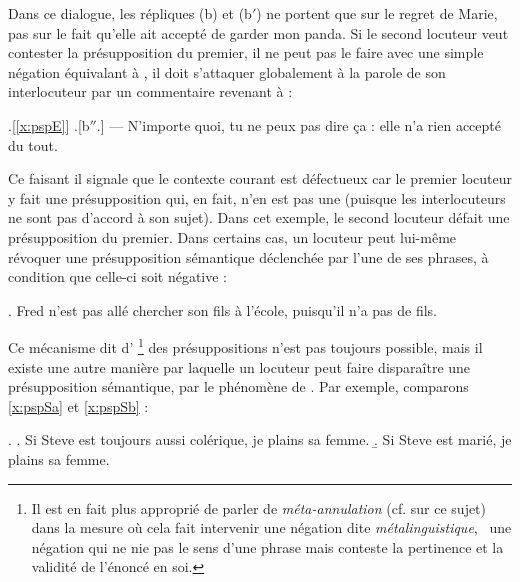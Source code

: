 \begin{refsegment}
Dans ce dialogue, les répliques (b) et (b$'$) ne portent que sur le regret de Marie, pas sur le fait qu'elle ait accepté de garder mon panda.
Si le second locuteur veut contester la présupposition du premier, il ne peut pas le faire avec une simple négation équivalant à , il doit s'attaquer globalement à la parole de son interlocuteur par un commentaire revenant à  : 

\ex.[\ref{x:pspE}] 
\a.[b$''$.] --- N'importe quoi, tu ne peux pas dire ça : elle n'a rien accepté du tout.

Ce faisant il signale que le contexte courant est défectueux car le premier locuteur y fait une présupposition qui, en fait, n'en est pas une (puisque les interlocuteurs ne sont pas d'accord à son sujet). 
Dans cet exemple, le second locuteur défait une présupposition du premier.  Dans certains cas, un locuteur peut lui-même révoquer une présupposition sémantique déclenchée par l'une de ses phrases, à condition que celle-ci soit négative :

\ex.
Fred n'est pas allé chercher son fils à l'école, puisqu'il n'a pas de fils.


Ce mécanisme dit d'%
\footnote{Il est en fait plus approprié de parler de \emph{méta-annulation} (cf. \citet{Amsili:07} sur ce sujet) dans la mesure où cela fait intervenir une négation dite \emph{métalinguistique},
\ie\ une négation qui ne nie pas le sens d'une phrase mais conteste la pertinence et la validité de l'énoncé en soi. }%
 des présuppositions n'est pas toujours possible, mais il existe une autre manière par laquelle un locuteur peut faire disparaître une présupposition sémantique, par le phénomène de .\label{p.suspen}  
Par exemple, comparons \ref{x:pspSa} et \ref{x:pspSb} :

\ex.
\a. Si Steve est toujours aussi colérique, je plains sa femme. \label{x:pspSa}
\b. Si Steve est marié, je plains sa femme. \label{x:pspSb}


\end{refsegment}
